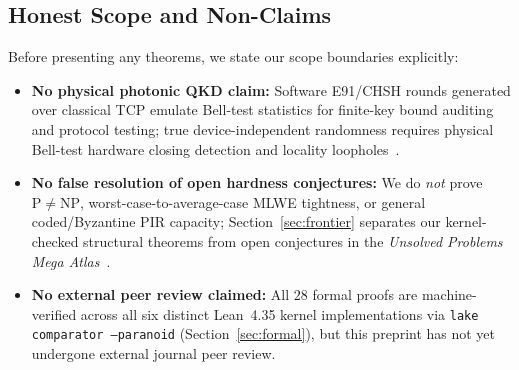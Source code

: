 \documentclass[11pt,reqno]{amsart}
\theoremstyle{definition}
\newcommand{\code}[1]{\texttt{\small #1}}
\begin{document}
\subsection*{Honest Scope and Non-Claims}
Before presenting any theorems, we state our scope boundaries explicitly:
\begin{itemize}[leftmargin=1.6em]
  \item \textbf{No physical photonic QKD claim:} Software E91/CHSH rounds generated over classical TCP emulate Bell-test statistics for finite-key bound auditing and protocol testing; true device-independent randomness requires physical Bell-test hardware closing detection and locality loopholes~\cite{pironio2010,arnonfriedman2018}.
  \item \textbf{No false resolution of open hardness conjectures:} We do \emph{not} prove $\mathrm{P}\neq\mathrm{NP}$, worst-case-to-average-case MLWE tightness, or general coded/Byzantine PIR capacity; Section~\ref{sec:frontier} separates our kernel-checked structural theorems from open conjectures in the \emph{Unsolved Problems Mega Atlas}~\cite{mega_atlas_2026}.
  \item \textbf{No external peer review claimed:} All $28$ formal proofs are machine-verified across all six distinct Lean~4.35 kernel implementations via \code{lake comparator --paranoid} (Section~\ref{sec:formal}), but this preprint has not yet undergone external journal peer review.
\end{itemize}
\end{document}
